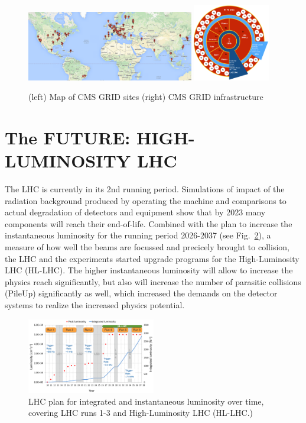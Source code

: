 \documentclass{wscpaperproc}
\theoremstyle{wsc}
\begin{document}
\begin{figure}[htb]
{
   \centering
   \includegraphics[width=0.65\textwidth]{grid}
   \includegraphics[width=0.3\textwidth]{grid2}
   \caption{(left) Map of CMS GRID sites (right) CMS GRID infrastructure
   \label{fig:grid}}
}
\end{figure}

\section{The FUTURE: HIGH-LUMINOSITY LHC}
\label{sec:hl-lhc}

The LHC is currently in its 2nd running period. Simulations of impact of the radiation background produced by operating the machine and comparisons to actual degradation of detectors and equipment show that by 2023 many components will reach their end-of-life. Combined with the plan to increase the instantaneous luminosity for the running period 2026-2037 (see Fig.~\ref{fig:hllhc}), a measure of how well the beams are focussed and precicely brought to collision, the LHC and the experiments started upgrade programs for the High-Luminosity LHC (HL-LHC). The higher instantaneous luminosity will allow to increase the physics reach significantly, but also will increase the number of parasitic collisions (PileUp) significantly as well, which increased the demands on the detector systems to realize the increased physics potential. 

\begin{figure}[htb]
{
   \centering
   \includegraphics[width=0.50\textwidth]{hllhc}
   \caption{LHC plan for integrated and instantaneous luminosity over time, covering LHC runs 1-3 and High-Luminosity LHC (HL-LHC.)
   \label{fig:hllhc}}
}
\end{figure}
\end{document}
